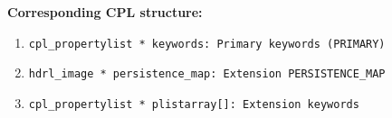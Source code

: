 \begin{datastructdef}
    \textbf{Corresponding \ac{CPL} structure:}
    \begin{enumerate}
            \item \texttt{cpl\_propertylist * keywords: Primary keywords (PRIMARY)}
            \item \texttt{hdrl\_image * persistence\_map: Extension PERSISTENCE\_MAP}
            \item \texttt{cpl\_propertylist * plistarray[]: Extension keywords}
    \end{enumerate}
\end{datastructdef}

